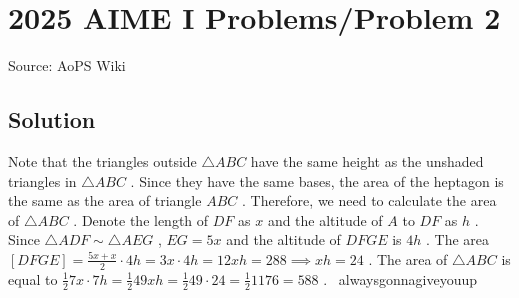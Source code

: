 \documentclass[12pt]{article}
\begin{document}
\section*{{2025 AIME I Problems/Problem 2}}
Source: AoPS Wiki

\subsection*{Solution}
Note that the triangles outside $\triangle ABC$ have the same height as the unshaded triangles in $\triangle ABC$ . Since they have the same bases, the area of the heptagon is the same as the area of triangle $ABC$ . Therefore, we need to calculate the area of $\triangle ABC$ . Denote the length of $DF$ as $x$ and the altitude of $A$ to $DF$ as $h$ . Since $\triangle ADF \sim \triangle AEG$ , $EG = 5x$ and the altitude of $DFGE$ is $4h$ . The area $[DFGE] = \frac{5x + x}{2} \cdot 4h = 3x \cdot 4h = 12xh = 288 \implies xh = 24$ . The area of $\triangle ABC$ is equal to $\frac{1}{2} 7x \cdot 7h = \frac{1}{2} 49xh = \frac{1}{2} 49 \cdot 24 = \frac{1}{2} 1176 = \boxed{588}$ . ~alwaysgonnagiveyouup
\end{document}
